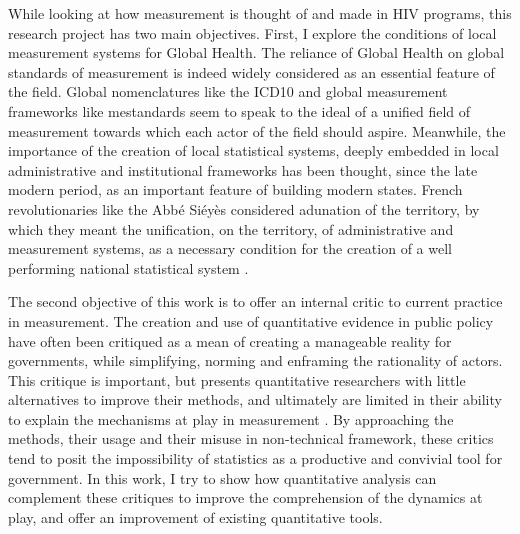 While looking at how measurement is thought of and made in HIV programs, this research project has two main objectives. First, I explore the conditions of local measurement systems for Global Health. The reliance of Global Health on global standards of measurement is indeed widely considered as an essential feature of the field. Global nomenclatures like the ICD10 and global measurement frameworks like \gls{me}standards seem to speak to the ideal of a unified field of measurement towards which each actor of the field should aspire. Meanwhile, the importance of the creation of local statistical systems, deeply embedded in local administrative and institutional frameworks has been thought, since the late modern period, as an important feature of building modern states. French revolutionaries like the Abbé Siéyès considered adunation of the territory, by which they meant the unification, on the territory, of administrative and measurement systems, as a necessary condition for the creation of a well performing national statistical system \citep{alain_desrosieres_prefet_1993}.

The second objective of this work is to offer an internal critic to current practice in measurement. The creation and use of quantitative evidence in public policy have often been critiqued as a mean of creating a manageable reality for governments, while simplifying, norming and enframing the rationality of actors. This critique is important, but presents quantitative researchers with little alternatives to improve their methods, and ultimately are limited in their ability to explain the mechanisms at play in measurement . By approaching the methods, their usage and their misuse in non-technical framework, these critics tend to posit the impossibility of statistics as a productive and convivial tool for government. In this work, I try to show how quantitative analysis can complement these critiques to improve the comprehension of the dynamics at play, and offer an improvement of existing quantitative tools.


